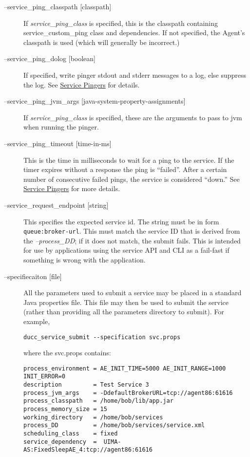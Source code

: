 \begin{description}
      \item[--service\_ping\_classpath {[classpath]}] If {\em service\_ping\_class} is specified,
        this is the classpath containing service\_custom\_ping class and dependencies.  If not
        specified, the Agent's classpath is used (which will generally be incorrect.)

      \item[--service\_ping\_dolog {[boolean]}] If specified, write pinger stdout and stderr
        messages to a log, else suppress the log. See \hyperref[sec:service.pingers]{Service Pingers}
        for details.

      \item[--service\_ping\_jvm\_args {[java-system-property-assignments]}] If 
        {\em service\_ping\_class} is specified, these are the arguments 
        to pass to jvm when running the pinger.

      \item[--service\_ping\_timeout {[time-in-ms]}] This is the time in milliseconds to wait for a
        ping to the service.  If the timer expires without a response the ping is ``failed''. After
        a certain number of consecutive failed pings, the service is considered ``down.''  See
        \hyperref[sec:service.pingers]{Service Pingers} for more details.

      \item[--service\_request\_endpoint {[string]}] This specifies the expected service id.  The string
        must be in form {\tt queue:broker-url}.  This must match the service ID that is derived from
        the {\em --process\_DD}; if it does not match, the submit fails.  This is intended for use
        by applications using the service API and CLI as a fail-fast if something is wrong with the
        application.

      \item[--specifiecaiton {[file]}] All the parameters used to submit a service may be placed in a
        standard Java properties file.  This file may then be used to submit the service (rather than
        providing all the parameters directory to submit).
        For example, 

\begin{verbatim}
ducc_service_submit --specification svc.props 
\end{verbatim}
        
        where the svc.props contains: 

\begin{verbatim}
process_environment = AE_INIT_TIME=5000 AE_INIT_RANGE=1000 INIT_ERROR=0
description         = Test Service 3
process_jvm_args    = -DdefaultBrokerURL=tcp://agent86:61616
process_classpath   = /home/bob/lib/app.jar
process_memory_size = 15
working_directory   = /home/bob/services
process_DD          = /home/bob/services/service.xml
scheduling_class    = fixed
service_dependency  =  UIMA-AS:FixedSleepAE_4:tcp://agent86:61616
\end{verbatim}
        

\end{description}
